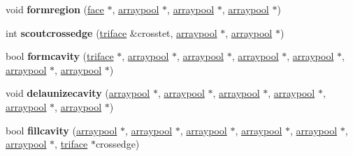 \begin{DoxyCompactItemize}
\item 
\hypertarget{classtetgenmesh_a7ab4434fb15cf630b24ac15acfd6d0f6}{void {\bfseries formregion} (\hyperlink{classtetgenmesh_1_1face}{face} $\ast$, \hyperlink{classtetgenmesh_1_1arraypool}{arraypool} $\ast$, \hyperlink{classtetgenmesh_1_1arraypool}{arraypool} $\ast$, \hyperlink{classtetgenmesh_1_1arraypool}{arraypool} $\ast$)}\label{classtetgenmesh_a7ab4434fb15cf630b24ac15acfd6d0f6}

\item 
\hypertarget{classtetgenmesh_a51147efb6aa8daeef94b7579997b23d0}{int {\bfseries scoutcrossedge} (\hyperlink{classtetgenmesh_1_1triface}{triface} \&crosstet, \hyperlink{classtetgenmesh_1_1arraypool}{arraypool} $\ast$, \hyperlink{classtetgenmesh_1_1arraypool}{arraypool} $\ast$)}\label{classtetgenmesh_a51147efb6aa8daeef94b7579997b23d0}

\item 
\hypertarget{classtetgenmesh_a3b116575f33fc21499796663ed1f9461}{bool {\bfseries formcavity} (\hyperlink{classtetgenmesh_1_1triface}{triface} $\ast$, \hyperlink{classtetgenmesh_1_1arraypool}{arraypool} $\ast$, \hyperlink{classtetgenmesh_1_1arraypool}{arraypool} $\ast$, \hyperlink{classtetgenmesh_1_1arraypool}{arraypool} $\ast$, \hyperlink{classtetgenmesh_1_1arraypool}{arraypool} $\ast$, \hyperlink{classtetgenmesh_1_1arraypool}{arraypool} $\ast$, \hyperlink{classtetgenmesh_1_1arraypool}{arraypool} $\ast$)}\label{classtetgenmesh_a3b116575f33fc21499796663ed1f9461}

\item 
\hypertarget{classtetgenmesh_ab1a82368937a13996efae911b8b1fded}{void {\bfseries delaunizecavity} (\hyperlink{classtetgenmesh_1_1arraypool}{arraypool} $\ast$, \hyperlink{classtetgenmesh_1_1arraypool}{arraypool} $\ast$, \hyperlink{classtetgenmesh_1_1arraypool}{arraypool} $\ast$, \hyperlink{classtetgenmesh_1_1arraypool}{arraypool} $\ast$, \hyperlink{classtetgenmesh_1_1arraypool}{arraypool} $\ast$, \hyperlink{classtetgenmesh_1_1arraypool}{arraypool} $\ast$)}\label{classtetgenmesh_ab1a82368937a13996efae911b8b1fded}

\item 
\hypertarget{classtetgenmesh_a7bbebc8419ee43b912236c4ba7f69ba7}{bool {\bfseries fillcavity} (\hyperlink{classtetgenmesh_1_1arraypool}{arraypool} $\ast$, \hyperlink{classtetgenmesh_1_1arraypool}{arraypool} $\ast$, \hyperlink{classtetgenmesh_1_1arraypool}{arraypool} $\ast$, \hyperlink{classtetgenmesh_1_1arraypool}{arraypool} $\ast$, \hyperlink{classtetgenmesh_1_1arraypool}{arraypool} $\ast$, \hyperlink{classtetgenmesh_1_1arraypool}{arraypool} $\ast$, \hyperlink{classtetgenmesh_1_1triface}{triface} $\ast$crossedge)}\label{classtetgenmesh_a7bbebc8419ee43b912236c4ba7f69ba7}


\end{DoxyCompactItemize}

